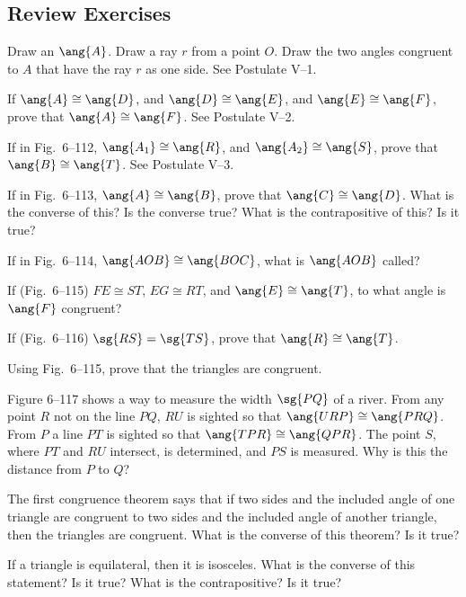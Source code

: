 \documentclass[11pt]{book}
\theoremstyle{bkplain}
\theoremstyle{XIplainnote}
\theoremstyle{bkplain}
\theoremstyle{bkplain}
\begin{document}
\subsection*{Review Exercises}
\begin{exlist}
\item Draw an $\ang{A}$. Draw a ray $r$ from a point $O$. Draw the two angles
  congruent to $A$ that have the ray $r$ as one side. See Postulate V--1.
\item If $\ang{A} \cong \ang{D}$, and $\ang{D} \cong \ang{E}$, and $\ang{E}
  \cong \ang{F}$, prove that $\ang{A} \cong \ang{F}$. See Postulate V--2.
\item If in Fig.~6--112, $\ang{A_1} \cong \ang{R}$, and $\ang{A_2} \cong
  \ang{S}$, prove that $\ang{B} \cong \ang{T}$. See Postulate V--3.
\exfig{\FIGVIONEHUNDREDTWELVE}
\item If in Fig.~6--113, $\ang{A} \cong \ang{B}$, prove that $\ang{C} \cong
  \ang{D}$. What is the converse of this? Is the converse true? What is the
  contrapositive of this? Is it true?
\exfig{\FIGVIONEHUNDREDTHIRTEEN}
\item If in Fig.~6--114, $\ang{AOB} \cong \ang{BOC}$, what is $\ang{AOB}$
  called?
\exfig{\FIGVIONEHUNDREDFOURTEEN}
\item If (Fig.~6--115) $FE \cong ST$, $EG \cong RT$, and $\ang{E} \cong
  \ang{T}$, to what angle is $\ang{F}$ congruent?
\exfig{\FIGVIONEHUNDREDFIFTEEN}
\item If (Fig.~6--116) $\sg{RS} = \sg{TS}$, prove that $\ang{R} \cong \ang{T}$.
\exfig{\FIGVIONEHUNDREDSIXTEEN}
\item Using Fig.~6--115, prove that the triangles are congruent.
\item Figure 6--117 shows a way to measure the width $\sg{PQ}$ of a river. From
  any point $R$ not on the line $PQ$, $RU$ is sighted so that $\ang{URP} \cong
  \ang{PRQ}$. From $P$ a line $PT$ is sighted so that $\ang{TPR} \cong
  \ang{QPR}$. The point $S$, where $PT$ and $RU$ intersect, is determined, and
  $PS$ is measured. Why is this the distance from $P$ to $Q$?
\exfig{\FIGVIONEHUNDREDSEVENTEEN}
\item The first congruence theorem says that if two sides and the included
  angle of one triangle are congruent to two sides and the included angle of
  another triangle, then the triangles are congruent. What is the converse of
  this theorem? Is it true?
\item If a triangle is equilateral, then it is isosceles. What is the converse
  of this statement? Is it true? What is the contrapositive? Is it true?

\end{exlist}
\end{document}
